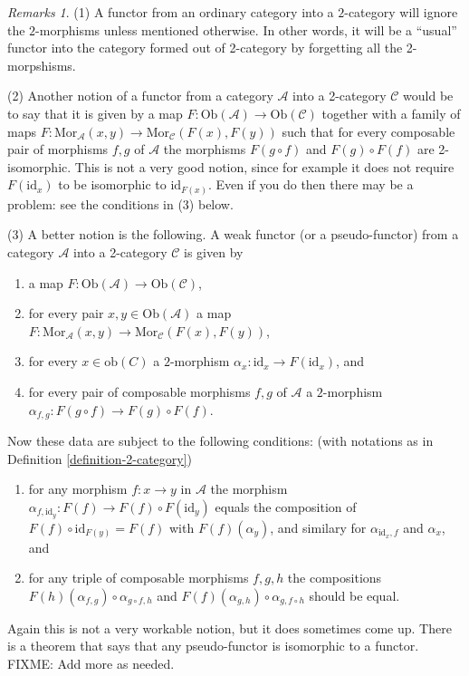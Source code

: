 \documentclass{amsart}
\theoremstyle{definition}
\theoremstyle{remark}
\newtheorem{remarks}[theorem]{Remarks}
\numberwithin{equation}{subsection}
\begin{document}
\begin{remarks}
\label{remarks-functor-into-2-category}
(1) A functor from an ordinary category into a $2$-category will ignore the
$2$-morphisms unless mentioned otherwise. In other words, it will be a 
``usual'' functor into the category formed out of 2-category by forgetting
all the 2-morpshisms.

\smallskip\noindent
(2) Another notion of a functor from a category $\mathcal{A}$ into a
2-category $\mathcal{C}$ would be to say that it is given by a map
$F : \text{Ob}(\mathcal{A}) \to \text{Ob}(\mathcal{C})$ together with a
family of maps 
$F : \text{Mor}_{\mathcal{A}}(x,y) \to \text{Mor}_{\mathcal{C}}(F(x),F(y))$
such that for every composable pair of morphisms $f,g$ of $\mathcal{A}$
the morphisms $F(g \circ f)$ and $F(g) \circ F(f)$ are 2-isomorphic. This is
not a very good notion, since for example it does not require $F(\text{id}_x)$
to be isomorphic to $\text{id}_{F(x)}$. Even if you do then
there may be a problem: see the conditions in (3) below.

\smallskip\noindent
(3) A better notion is the following. A weak functor (or a pseudo-functor)
from a category $\mathcal{A}$ into a 2-category $\mathcal{C}$ is given by 
\begin{enumerate}
\item a map $F : \text{Ob}(\mathcal{A}) \to \text{Ob}(\mathcal{C})$,
\item for every pair $x,y\in \text{Ob}(\mathcal{A})$ a map
$F : \text{Mor}_{\mathcal{A}}(x,y) \to  \text{Mor}_{\mathcal{C}}(F(x),F(y))$,
\item for every $x\in \text{ob}(C)$ a $2$-morphism
$\alpha_x : \text{id}_x \to F(\text{id}_{x})$, and
\item for every pair of composable morphisms $f,g$ of $\mathcal{A}$ a 
$2$-morphism $\alpha_{f,g} : F(g \circ f) \to F(g) \circ F(f)$.
\end{enumerate}
Now these data are subject to the following conditions:
(with notations as in Definition \ref{definition-2-category})
\begin{enumerate}
\item for any morphism $f : x \to y$ in $\mathcal{A}$ the morphism
$\alpha_{f,\text{id}_y} : F(f) \to F(f) \circ F(\text{id}_y)$
equals the composition of $F(f) \circ \text{id}_{F(y)} = F(f)$ with
$F(f)(\alpha_y)$, and similary for $\alpha_{\text{id}_x,f}$ and
$\alpha_x$, and
\item for any triple of composable morphisms $f,g,h$ the
compositions $F(h)(\alpha_{f,g}) \circ \alpha_{g\circ f, h}$ and
$F(f)(\alpha_{g,h}) \circ \alpha_{g,f\circ h}$ should be equal.
\end{enumerate}
Again this is not a very workable notion, but it does sometimes come up.
There is a theorem that says that any pseudo-functor is isomorphic to
a functor. FIXME: Add more as needed.
\end{remarks}
\end{document}
